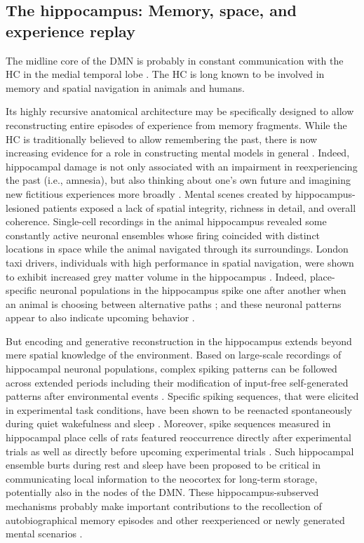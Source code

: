 \documentclass[10pt,letterpaper]{article}
\begin{document}
\subsection{The hippocampus: Memory, space, and experience replay}
The midline core of the DMN is probably in constant communication
with the HC in the medial temporal lobe \citep{vincet2006}.
The HC is long known to be involved in memory and spatial navigation in animals and humans.



Its highly recursive anatomical architecture
may be specifically designed to allow reconstructing
entire episodes of experience from memory fragments.
%
While the HC
is traditionally believed to allow remembering the past,
there is now increasing evidence for a role
in constructing mental models in general
\citep{maguire2016, schacter2007remembering, gelbard2008internally, Javadi2017}.
Indeed,
hippocampal damage is
not only associated with an impairment in reexperiencing the past (i.e., amnesia),
but also thinking about one's own future and
imagining new fictitious experiences more broadly \citep{hassabis2007patients}.
Mental scenes created by hippocampus-lesioned patients exposed a lack of
spatial integrity, richness in detail, and overall coherence.
%
Single-cell recordings in the animal hippocampus revealed
some constantly active neuronal ensembles whose firing coincided with
distinct locations in space while the animal navigated through its surroundings.
London taxi drivers, individuals with high performance in spatial navigation,
were shown to exhibit increased grey matter volume in the
hippocampus \citep{maguire2000navigation}.
Indeed, place-specific neuronal populations in the hippocampus
spike one after another when an animal is choosing between alternative
paths \citep{johnson2007neural}; and
these neuronal patterns appear to also indicate upcoming behavior
\citep{pfeiffer2013hippocampal}.


But encoding and generative reconstruction in the hippocampus extends
beyond mere spatial knowledge of the environment.
Based on large-scale recordings of hippocampal neuronal populations,
complex spiking patterns can be followed across extended periods including
their modification of input-free self-generated patterns
after environmental events \citep{buzsaki2004large}.
Specific spiking sequences, that were elicited in experimental task conditions,
have been shown to be reenacted spontaneously during
quiet wakefulness and sleep \citep{hartley2014space, o2010play}.
Moreover, spike sequences measured in hippocampal place cells of rats
featured reoccurrence directly after experimental trials
as well as directly before upcoming experimental trials \citep{diba2007forward}.
Such hippocampal ensemble burts during rest and sleep
have been proposed to be critical in communicating local information
to the neocortex for long-term storage, potentially also in the nodes of the DMN.
These hippocampus-subserved mechanisms
probably make important contributions to the
recollection of autobiographical memory episodes and other
reexperienced or newly generated mental scenarios
\citep{hassabis2007patients}.
\end{document}
